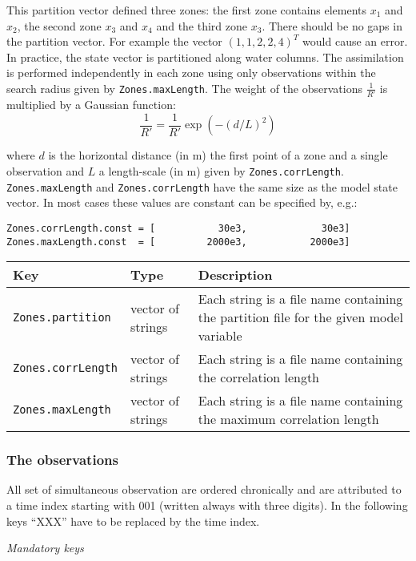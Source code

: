 \documentclass[a4paper,12pt]{article}
\newcommand{\code}{\texttt}
\newenvironment{keytabular}{\begin{tabular}{|p{0.3\textwidth}|p{0.2\textwidth}|p{0.5\textwidth}|} \hline Key & Type & Description \\ \hline \hline }{\end{tabular}}
\newcommand{\subsubsubsection}[1]{\bigskip \textit{#1} \medskip}
\begin{document}
This partition vector defined three zones: the first zone contains elements $x_1$ and $x_2$, the second zone $x_3$ and $x_4$ and the third zone $x_3$. There should be no gaps in the partition vector. For example the vector $(1,1,2,2,4)^T$ would cause an error. 
In practice, the state vector is partitioned along water columns.
The assimilation is performed independently in each zone using only observations within the search radius given by 
\code{Zones.maxLength}. The weight of the observations $\frac{1}{R'}$ is multiplied by a Gaussian function:
\begin{equation}
\frac{1}{R'} = \frac{1}{R'} \exp(- (d/L)^2)
\end{equation}

where $d$ is the horizontal distance (in m) the first point of a zone and a single observation and $L$ a length-scale (in m) given by \code{Zones.corrLength}. \code{Zones.maxLength} and \code{Zones.corrLength} have the same size as the model state vector. In most cases these values are constant can be specified by, e.g.:

\begin{verbatim} 
Zones.corrLength.const = [           30e3,             30e3]
Zones.maxLength.const  = [         2000e3,           2000e3]
\end{verbatim}

\begin{keytabular}
\code{Zones.partition} & vector of strings & Each string is a file name containing
  the partition file for the given model variable
\\
\code{Zones.corrLength} & vector of strings & Each string is a file name containing 
  the correlation length
\\
\code{Zones.maxLength} & vector of strings & Each string is a file name containing 
  the maximum correlation length
\\
\hline
\end{keytabular}


\subsubsection{The observations}

All set of simultaneous observation are ordered chronically and are attributed to a time
index starting with 001 (written always with three digits). In the
following keys ``XXX'' have to be replaced by the time index. 


\subsubsubsection{Mandatory keys}
\end{document}
